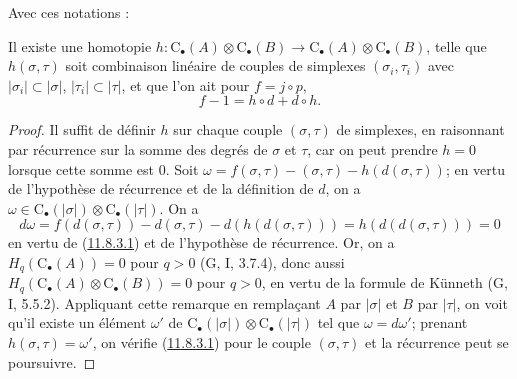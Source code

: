 Avec ces notations :
\begin{proposition}[11.8.3]
\label{0.11.8.3-fr}
{Il existe une homotopie
$h:\mathrm C_\bullet(A)\otimes\mathrm C_\bullet(B)\longrightarrow\mathrm C_\bullet(A)\otimes\mathrm C_\bullet(B)$,
telle que $h(\sigma,\tau)$ soit combinaison linéaire de couples de simplexes
$(\sigma_i,\tau_i)$ avec $|\sigma_i|\subset|\sigma|$,
$|\tau_i|\subset|\tau|$, et que l'on ait pour $f=j\circ p$,}
\[
\label{0.11.8.3.1-fr}
\tag{11.8.3.1}
f-1=h\circ d+d\circ h.
\]
\end{proposition}

\begin{proof}
Il suffit de définir $h$ sur chaque couple $(\sigma,\tau)$ de simplexes, en
raisonnant par récurrence sur la somme des degrés de $\sigma$ et $\tau$, car
on peut prendre $h=0$ lorsque cette somme est $0$. Soit
$\omega=f(\sigma,\tau)-(\sigma,\tau)-h(d(\sigma,\tau))$;
en vertu de l'hypothèse de récurrence et de la définition de $d$, on a
$\omega\in\mathrm C_\bullet(|\sigma|)\otimes\mathrm C_\bullet(|\tau|)$.
On a
\[
d\omega=f(d(\sigma,\tau))-d(\sigma,\tau)-d(h(d(\sigma,\tau)))
=h(d(d(\sigma,\tau)))=0
\]
en vertu de (\hyperref[0.11.8.3.1-fr]{11.8.3.1}) et de l'hypothèse de
récurrence. Or, on a
$H_q(\mathrm C_\bullet(A))=0$ pour $q>0$ (G, I, 3.7.4), donc aussi
$H_q(\mathrm C_\bullet(A)\otimes\mathrm C_\bullet(B))=0$ pour $q>0$,
en vertu de la formule de Künneth (G, I, 5.5.2). Appliquant cette remarque en
remplaçant $A$ par $|\sigma|$ et $B$ par $|\tau|$, on voit qu'il existe un
élément
$\omega'$ de $\mathrm C_\bullet(|\sigma|)\otimes\mathrm C_\bullet(|\tau|)$
tel que $\omega=d\omega'$; prenant $h(\sigma,\tau)=\omega'$, on vérifie
(\hyperref[0.11.8.3.1-fr]{11.8.3.1}) pour le couple $(\sigma,\tau)$ et la
récurrence peut se poursuivre.
\end{proof}

